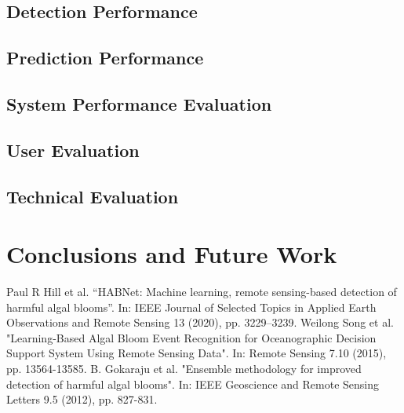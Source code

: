\documentclass[conference]{IEEEtran}
\begin{document}
\subsection{Detection Performance}



\subsection{Prediction Performance}


\subsection{System Performance Evaluation}



\subsection{User Evaluation}



\subsection{Technical Evaluation}


\section{Conclusions and Future Work}

\begin{thebibliography}{00}
 Paul R Hill et al. “HABNet: Machine learning, remote sensing-based detection of harmful algal blooms”.
In: IEEE Journal of Selected Topics in Applied Earth Observations and Remote Sensing 13 (2020),
pp. 3229–3239.
 Weilong Song et al. "Learning-Based Algal Bloom Event Recognition for Oceanographic Decision Support System Using Remote Sensing Data". In: Remote Sensing 7.10 (2015), pp. 13564-13585.
 B. Gokaraju et al. "Ensemble methodology for improved detection of harmful algal blooms". In: IEEE Geoscience and Remote Sensing Letters 9.5 (2012), pp. 827-831.
\end{thebibliography}
\end{document}
